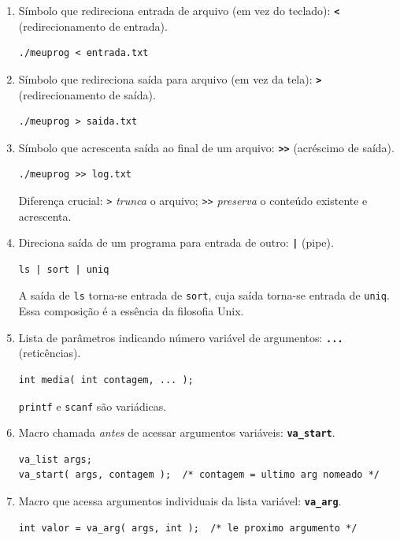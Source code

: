\documentclass[12pt,a4paper]{article}
\begin{document}
\begin{respostabox}
\begin{enumerate}[label=\textbf{\alph*)}]

\item Símbolo que redireciona entrada de arquivo (em vez do teclado):
\textbf{\texttt{<}} (redirecionamento de entrada).
\begin{lstlisting}
./meuprog < entrada.txt
\end{lstlisting}

\item Símbolo que redireciona saída para arquivo (em vez da tela):
\textbf{\texttt{>}} (redirecionamento de saída).
\begin{lstlisting}
./meuprog > saida.txt
\end{lstlisting}

\item Símbolo que acrescenta saída ao final de um arquivo:
\textbf{\texttt{>>}} (acréscimo de saída).
\begin{lstlisting}
./meuprog >> log.txt
\end{lstlisting}
Diferença crucial: \texttt{>} \textit{trunca} o arquivo; \texttt{>>}
\textit{preserva} o conteúdo existente e acrescenta.

\item Direciona saída de um programa para entrada de outro:
\textbf{\texttt{|}} (pipe).
\begin{lstlisting}
ls | sort | uniq
\end{lstlisting}
A saída de \texttt{ls} torna-se entrada de \texttt{sort}, cuja saída
torna-se entrada de \texttt{uniq}. Essa composição é a essência da
filosofia Unix.

\item Lista de parâmetros indicando número variável de argumentos:
\textbf{\texttt{...}} (reticências).
\begin{lstlisting}
int media( int contagem, ... );
\end{lstlisting}
\texttt{printf} e \texttt{scanf} são variádicas.

\item Macro chamada \textit{antes} de acessar argumentos variáveis:
\textbf{\texttt{va\_start}}.
\begin{lstlisting}
va_list args;
va_start( args, contagem );  /* contagem = ultimo arg nomeado */
\end{lstlisting}

\item Macro que acessa argumentos individuais da lista variável:
\textbf{\texttt{va\_arg}}.
\begin{lstlisting}
int valor = va_arg( args, int );  /* le proximo argumento */
\end{lstlisting}


\end{enumerate}
\end{respostabox}
\end{document}
